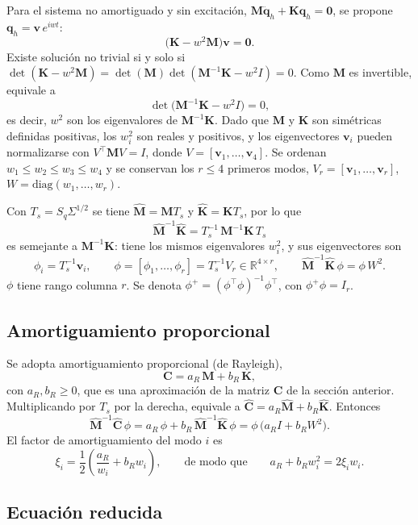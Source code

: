 Para el sistema no amortiguado y sin excitación, $\mathbf M\ddot{\mathbf q}_h+\mathbf K\mathbf q_h=\mathbf 0$, se propone $\mathbf q_h=\mathbf v\,e^{iwt}$:
\[
\big(\mathbf K-w^2\mathbf M\big)\mathbf v=\mathbf 0 .
\]
Existe solución no trivial si y solo si $\det(\mathbf K-w^2\mathbf M)=\det(\mathbf M)\det(\mathbf M^{-1}\mathbf K-w^2I)=0$.
 Como $\mathbf M$ es invertible, equivale a
\[
\det\big(\mathbf M^{-1}\mathbf K-w^2I\big)=0,
\]
es decir, $w^2$ son los eigenvalores de $\mathbf M^{-1}\mathbf K$. Dado que $\mathbf M$ y $\mathbf K$ son simétricas definidas
 positivas, los $w_i^2$ son reales y positivos, y los eigenvectores $\mathbf v_i$ pueden normalizarse con $V^\top\mathbf MV=I$, 
 donde $V=[\mathbf v_1,\ldots,\mathbf v_4]$. Se ordenan $w_1\le w_2\le w_3\le w_4$ y se conservan los $r\le4$ primeros modos, 
 $V_r=[\mathbf v_1,\ldots,\mathbf v_r]$, $W=\mathrm{diag}(w_1,\ldots,w_r)$.

Con $T_s=S_q\Sigma^{1/2}$ se tiene $\hat{\mathbf M}=\mathbf MT_s$ y $\hat{\mathbf K}=\mathbf KT_s$, por lo que
\[
\hat{\mathbf M}^{-1}\hat{\mathbf K}=T_s^{-1}\,\mathbf M^{-1}\mathbf K\,T_s
\]
es semejante a $\mathbf M^{-1}\mathbf K$: tiene los mismos eigenvalores $w_i^2$, y sus eigenvectores son
\[
\phi_i=T_s^{-1}\mathbf v_i,\qquad \phi=[\phi_1,\ldots,\phi_r]=T_s^{-1}V_r\in\mathbb R^{4\times r},
\qquad
\hat{\mathbf M}^{-1}\hat{\mathbf K}\,\phi=\phi\,W^2 .
\]
$\phi$ tiene rango columna $r$. Se denota $\phi^{+}=(\phi^\top\phi)^{-1}\phi^\top$, con $\phi^{+}\phi=I_r$.

\subsection{Amortiguamiento proporcional}

Se adopta amortiguamiento proporcional (de Rayleigh),
\[
\mathbf C=a_R\,\mathbf M+b_R\,\mathbf K,
\]
con $a_R,b_R\ge0$, que es una aproximación de la matriz $\mathbf C$ de la sección anterior. Multiplicando por $T_s$ por la
 derecha, equivale a $\hat{\mathbf C}=a_R\hat{\mathbf M}+b_R\hat{\mathbf K}$. Entonces
\[
\hat{\mathbf M}^{-1}\hat{\mathbf C}\,\phi=a_R\,\phi+b_R\,\hat{\mathbf M}^{-1}\hat{\mathbf K}\,\phi=\phi\,\big(a_RI+b_RW^2\big).
\]
El factor de amortiguamiento del modo $i$ es
\[
\xi_i=\frac12\left(\frac{a_R}{w_i}+b_Rw_i\right),\qquad\text{de modo que}\qquad a_R+b_Rw_i^2=2\xi_iw_i .
\]

\subsection{Ecuación reducida}

